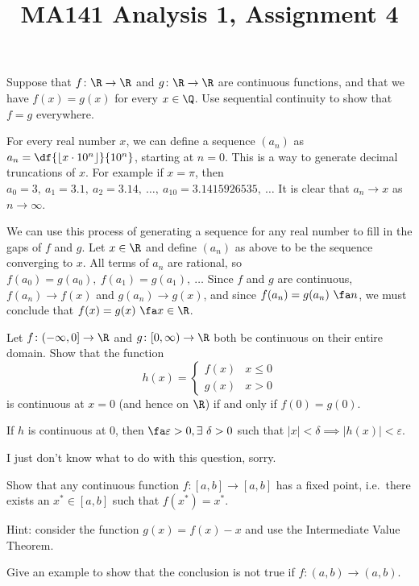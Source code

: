 \documentclass[a4paper]{article}
\title{MA141 Analysis 1, Assignment 4}
\begin{document}
\maketitle

\setlength{\parindent}{0em}
\setlength{\parskip}{1em}


\begin{questionbody}
Suppose that $f \colon \R \to \R$ and $g \colon \R \to \R$ are continuous functions, and that we have $f(x) = g(x)$ for every $x \in \Q$. Use sequential continuity to show that $f = g$ everywhere.
\end{questionbody}

For every real number $x$, we can define a sequence $(a_n)$ as $a_n = \df{\lfloor x \cdot 10^n \rfloor}{10^n}$, starting at $n=0$. This is a way to generate decimal truncations of $x$. For example if $x = \pi$, then $a_0 = 3,\ a_1 = 3.1,\ a_2 = 3.14,\ \ldots,\ a_{10} = 3.1415926535,\ \ldots$ It is clear that $a_n \to x$ as $n \to \infty$.

We can use this process of generating a sequence for any real number to fill in the gaps of $f$ and $g$. Let $x \in \R$ and define $(a_n)$ as above to be the sequence converging to $x$. All terms of $a_n$ are rational, so $f(a_0) = g(a_0),\ f(a_1) = g(a_1),\ \ldots$ Since $f$ and $g$ are continuous, $f(a_n) \to f(x)$ and $g(a_n) \to g(x)$, and since $f(a_n) = g(a_n)\ \fa n$, we must conclude that $f(x) = g(x)\ \fa x \in \R$.


\begin{questionbody}
Let $f \colon (-\infty, 0] \to \R$ and $g \colon [0, \infty) \to \R$ both be continuous on their entire domain. %
Show that the function \[
h(x) = \begin{cases}
    f(x) & x \le 0 \\
    g(x) & x > 0
\end{cases} \]
is continuous at $x = 0$ (and hence on $\R$) if and only if $f(0) = g(0)$.
\end{questionbody}

If $h$ is continuous at 0, then $\fa \varepsilon > 0, \exists\ \delta > 0$ such that $|x| < \delta \implies |h(x)| < \varepsilon$.

I just don't know what to do with this question, sorry.


\begin{questionbody}
Show that any continuous function $f \colon [a, b] \to [a, b]$ has a fixed point, i.e.\ there exists an $x^* \in [a, b]$ such that $f(x^*) = x^*$.

Hint: consider the function $g(x) = f(x) - x$ and use the Intermediate Value Theorem.

Give an example to show that the conclusion is not true if $f \colon (a, b) \to (a, b)$.
\end{questionbody}
\end{document}
